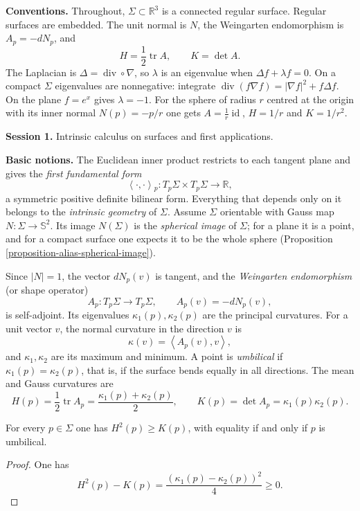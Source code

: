 \medskip\noindent
{\bf Conventions.}
Throughout, $\Sigma\subset\mathbb{R}^3$ is
a connected regular surface. Regular
surfaces are embedded. The unit normal
is $N$, the Weingarten endomorphism is
$A_p=-dN_p$, and
$$
H=\frac{1}{2}\operatorname{tr}A,
\qquad
K=\det A.
$$
The Laplacian is
$\Delta=\operatorname{div}\circ\nabla$,
so $\lambda$ is an eigenvalue when
$\Delta f+\lambda f=0$. On a compact
$\Sigma$ eigenvalues are nonnegative:
integrate $\operatorname{div}(f\nabla f)=
|\nabla f|^2+f\Delta f$. On the plane
$f=e^x$ gives $\lambda=-1$. For the sphere
of radius $r$
centred at the origin with its inner
normal $N(p)=-p/r$ one gets
$A=\frac{1}{r}\operatorname{id}$, $H=1/r$
and $K=1/r^2$.

\medskip\noindent
{\bf Session 1.}
Intrinsic calculus on surfaces and first
applications.

\medskip\noindent
{\bf Basic notions.}
The Euclidean inner product restricts to
each tangent plane and gives the
\emph{first fundamental form}
$$
\left\langle{} \cdot,\cdot
\right\rangle{}_p:
T_p\Sigma\times T_p\Sigma\to\mathbb{R},
$$
a symmetric positive definite bilinear
form. Everything that depends only on it
belongs to the \emph{intrinsic geometry}
of $\Sigma$. Assume $\Sigma$ orientable
with Gauss map $N:\Sigma\to\mathbb{S}^2$.
Its image $N(\Sigma)$ is the
\emph{spherical image} of $\Sigma$; for a
plane it is a point, and for a compact
surface one expects it to be the whole
sphere (Proposition
\ref{proposition-alias-spherical-image}).

Since $|N|=1$, the vector $dN_p(v)$ is
tangent, and the \emph{Weingarten
endomorphism} (or shape operator)
$$
A_p:T_p\Sigma\to T_p\Sigma,
\qquad
A_p(v)=-dN_p(v),
$$
is self-adjoint. Its eigenvalues
$\kappa_1(p),\kappa_2(p)$ are the
principal curvatures. For a unit vector
$v$, the normal curvature in the direction
$v$ is
$$
\kappa(v)=
\left\langle{} A_p(v),v
\right\rangle{},
$$
and $\kappa_1,\kappa_2$ are its maximum
and minimum. A point is \emph{umbilical}
if $\kappa_1(p)=\kappa_2(p)$, that is, if
the surface bends equally in all
directions. The mean and Gauss curvatures
are
$$
H(p)=\frac{1}{2}\operatorname{tr}A_p
=\frac{\kappa_1(p)+\kappa_2(p)}{2},
\qquad
K(p)=\det A_p=\kappa_1(p)\kappa_2(p).
$$

\begin{lemma}
\label{lemma-alias-h2-geq-k}
For every $p\in\Sigma$ one has
$H^2(p)\geq K(p)$, with equality if and
only if $p$ is umbilical.
\end{lemma}

\begin{proof}
One has
$$
H^2(p)-K(p)
=\frac{(\kappa_1(p)-\kappa_2(p))^2}{4}
\geq 0.
$$
\end{proof}

